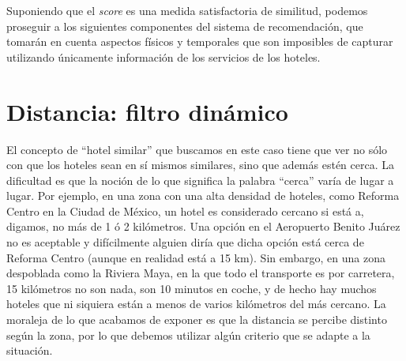\documentclass[12pt]{report}
\begin{document}
Suponiendo que el \emph{score} es una medida satisfactoria de similitud, podemos proseguir a los siguientes componentes del sistema de recomendación, que tomarán en cuenta aspectos físicos y temporales que son imposibles de capturar utilizando únicamente información de los servicios de los hoteles.

\section{Distancia: filtro dinámico}

El concepto de ``hotel similar'' que buscamos en este caso tiene que ver no sólo con que los hoteles sean en sí mismos similares, sino que además estén cerca. La dificultad es que la noción de lo que significa la palabra ``cerca'' varía de lugar a lugar. Por ejemplo, en una zona con una alta densidad de hoteles, como Reforma Centro en la Ciudad de México, un hotel es considerado cercano si está a, digamos, no más de 1 ó 2 kilómetros. Una opción en el Aeropuerto Benito Juárez no es aceptable y difícilmente alguien diría que dicha opción está cerca de Reforma Centro (aunque en realidad está a 15 km). Sin embargo, en una zona despoblada como la Riviera Maya, en la que todo el transporte es por carretera, 15 kilómetros no son nada, son 10 minutos en coche, y de hecho hay muchos hoteles que ni siquiera están a menos de varios kilómetros del más cercano. La moraleja de lo que acabamos de exponer es que la distancia se percibe distinto según la zona, por lo que debemos utilizar algún criterio que se adapte a la situación.
\end{document}
